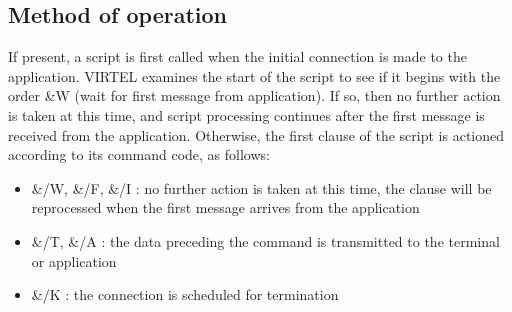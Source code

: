 \documentclass[letterpaper,10pt,english]{sphinxmanual}
\begin{document}
\subsection{Method of operation}
\label{\detokenize{connectivity_guide:method-of-operation}}\label{\detokenize{connectivity_guide:index-124}}
\sphinxAtStartPar
If present, a script is first called when the initial connection is made to the application. VIRTEL examines the start of the script to see if it begins with the order \&W (wait for first message from application). If so, then no further action is taken at this time, and script processing continues after the first message is received from the application. Otherwise, the first clause of the script is actioned according to its command code, as follows:
\begin{itemize}
\item {} 
\sphinxAtStartPar
\&/W, \&/F, \&/I : no further action is taken at this time, the clause will be reprocessed when the first message arrives from the application

\item {} 
\sphinxAtStartPar
\&/T, \&/A : the data preceding the command is transmitted to the terminal or application

\item {} 
\sphinxAtStartPar
\&/K : the connection is scheduled for termination

\end{itemize}
\end{document}
